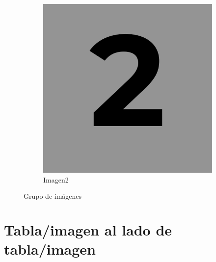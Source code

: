 \begin{figure}[H]
\begin{subfigure}{0.4\textwidth}
        \includegraphics[width=\textwidth]{img/img2.png}
        \caption{Imagen2}
        \label{fig:imagen2}
    \end{subfigure}
    \caption{Grupo de imágenes}
    \label{fig:grupoimagenes}
\end{figure}

\section{Tabla/imagen al lado de tabla/imagen}

